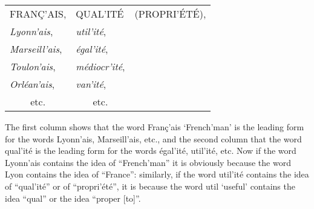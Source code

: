 {    \begin{center}
        \begin{tabular}[t]{ll@{ }l}
          FRANÇ'AIS, & QUAL'ITÉ & (PROPRI'ÉTÉ),\\
          \emph{Lyonn'ais}, & \emph{util'ité},\\
          \emph{Marseill'ais},  & \emph{égal'ité},\\
          \emph{Toulon'ais},  & \emph{médiocr'ité},\\
          \emph{Orléan'ais},  & \emph{van'ité},\\
          \multicolumn{1}{c}{etc.}  & \multicolumn{1}{c}{etc.}.
        \end{tabular}
      \end{center}

      The first column shows that the word \textup{Fran\c{c}'ais}
      `French'man' is the leading form for the words
      \textup{Lyonn'ais}, \textup{Marseill'ais}, etc., and the second
      column that the word \textup{qual'ité} is the leading form for
      the words \textup{égal'ité}, \textup{util'ité}, etc. Now if the
      word \textup{Lyonn'ais} contains the idea of ``French'man'' it
      is obviously because the word \textup{Lyon} contains the idea of
      ``France'': similarly, if the word \textup{util'ité} contains
      the idea of ``qual'ité'' or of ``propri'été'', it is because the
      word \textup{util} `useful' contains the idea ``qual'' or the
      idea ``proper [to]''.
    }

